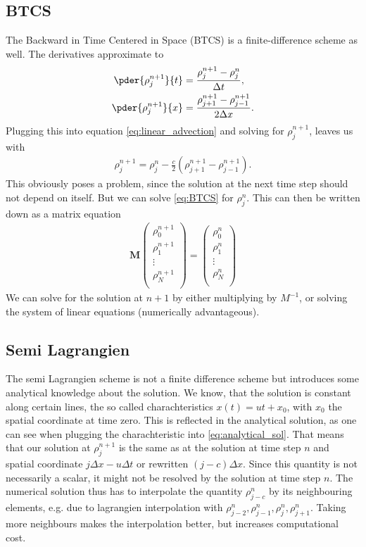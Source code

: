 \subsection{BTCS}
The Backward in Time Centered in Space  (BTCS) is a finite-difference scheme as well. The derivatives approximate to
\begin{align}
\pder{\rho^{n+1}_j}{t}&=\frac{\rho_j^{n+1}-\rho_j^{n}}{\Delta t},\\
\pder{\rho^{n+1}_j}{x}&=\frac{\rho_{j+1}^{n+1}-\rho_{j-1}^{n+1}}{2\Delta x}.
\end{align}
Plugging this into equation \cref{eq:linear_advection} and solving for $\rho^{n+1}_j$, leaves us with
\begin{align}
\rho_j^{n+1}=\rho_j^n-\frac c2\left(\rho_{j+1}^{n+1}-\rho_{j-1}^{n+1}\right).\label{eq:BTCS}
\end{align}
This obviously poses a problem, since the solution at the next time step should not depend on itself. But we can solve  \cref{eq:BTCS} for $\rho_j^n$.
This can then be written down as a matrix equation
\begin{align}
\bm M \begin{pmatrix}
\rho^{n+1}_0\\
\rho^{n+1}_1\\
\vdots\\
\rho^{n+1}_N\\
\end{pmatrix}
=
\begin{pmatrix}
\rho^{n}_0\\
\rho^{n}_1\\
\vdots\\
\rho^{n}_N\\
\end{pmatrix}
\end{align}
We can solve for the solution at $n+1$ by either multiplying by $M^{-1}$, or solving the system of linear equations (numerically advantageous).
\subsection{Semi Lagrangien}
The semi Lagrangien scheme is not a finite difference scheme but introduces some analytical knowledge about the solution. We know, that the solution is constant along certain lines, the so called charachteristics $x(t) = ut+x_0$, with $x_0$ the spatial coordinate at time zero. This is reflected in the analytical solution, as one can see when plugging the charachteristic into  \cref{eq:analytical_sol}. That means that  our solution at $\rho_j^{n+1}$ is the same as at the solution at time step $n$ and spatial coordinate $j\Delta x -u\Delta t$ or rewritten $(j-c)\Delta x$. Since this quantity is not necessarily a scalar, it might not be resolved by the solution at time step $n$. The numerical solution thus has to interpolate the quantity $\rho_{j-c}^n$ by its neighbouring elements, e.g.  due to lagrangien interpolation with $\rho_{j-2}^n, \rho_{j-1}^n, \rho_{j}^n, \rho_{j+1}^n$. Taking more neighbours makes the interpolation better, but increases computational cost.

